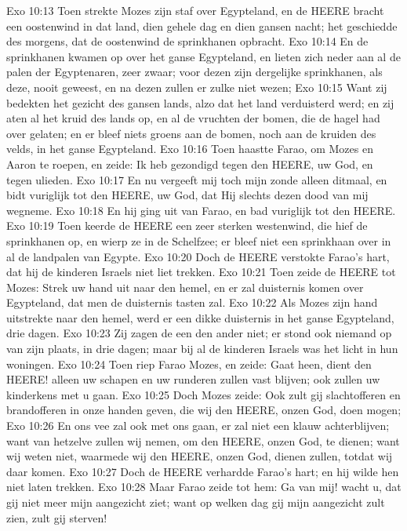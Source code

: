 Exo 10:13  Toen strekte Mozes zijn staf over Egypteland, en de HEERE bracht een oostenwind in dat land, dien gehele dag en dien gansen nacht; het geschiedde des morgens, dat de oostenwind de sprinkhanen opbracht.
Exo 10:14  En de sprinkhanen kwamen op over het ganse Egypteland, en lieten zich neder aan al de palen der Egyptenaren, zeer zwaar; voor dezen zijn dergelijke sprinkhanen, als deze, nooit geweest, en na dezen zullen er zulke niet wezen;
Exo 10:15  Want zij bedekten het gezicht des gansen lands, alzo dat het land verduisterd werd; en zij aten al het kruid des lands op, en al de vruchten der bomen, die de hagel had over gelaten; en er bleef niets groens aan de bomen, noch aan de kruiden des velds, in het ganse Egypteland.
Exo 10:16  Toen haastte Farao, om Mozes en Aaron te roepen, en zeide: Ik heb gezondigd tegen den HEERE, uw God, en tegen ulieden.
Exo 10:17  En nu vergeeft mij toch mijn zonde alleen ditmaal, en bidt vuriglijk tot den HEERE, uw God, dat Hij slechts dezen dood van mij wegneme.
Exo 10:18  En hij ging uit van Farao, en bad vuriglijk tot den HEERE.
Exo 10:19  Toen keerde de HEERE een zeer sterken westenwind, die hief de sprinkhanen op, en wierp ze in de Schelfzee; er bleef niet een sprinkhaan over in al de landpalen van Egypte.
Exo 10:20  Doch de HEERE verstokte Farao's hart, dat hij de kinderen Israels niet liet trekken.
Exo 10:21  Toen zeide de HEERE tot Mozes: Strek uw hand uit naar den hemel, en er zal duisternis komen over Egypteland, dat men de duisternis tasten zal.
Exo 10:22  Als Mozes zijn hand uitstrekte naar den hemel, werd er een dikke duisternis in het ganse Egypteland, drie dagen.
Exo 10:23  Zij zagen de een den ander niet; er stond ook niemand op van zijn plaats, in drie dagen; maar bij al de kinderen Israels was het licht in hun woningen.
Exo 10:24  Toen riep Farao Mozes, en zeide: Gaat heen, dient den HEERE! alleen uw schapen en uw runderen zullen vast blijven; ook zullen uw kinderkens met u gaan.
Exo 10:25  Doch Mozes zeide: Ook zult gij slachtofferen en brandofferen in onze handen geven, die wij den HEERE, onzen God, doen mogen;
Exo 10:26  En ons vee zal ook met ons gaan, er zal niet een klauw achterblijven; want van hetzelve zullen wij nemen, om den HEERE, onzen God, te dienen; want wij weten niet, waarmede wij den HEERE, onzen God, dienen zullen, totdat wij daar komen.
Exo 10:27  Doch de HEERE verhardde Farao's hart; en hij wilde hen niet laten trekken.
Exo 10:28  Maar Farao zeide tot hem: Ga van mij! wacht u, dat gij niet meer mijn aangezicht ziet; want op welken dag gij mijn aangezicht zult zien, zult gij sterven!
